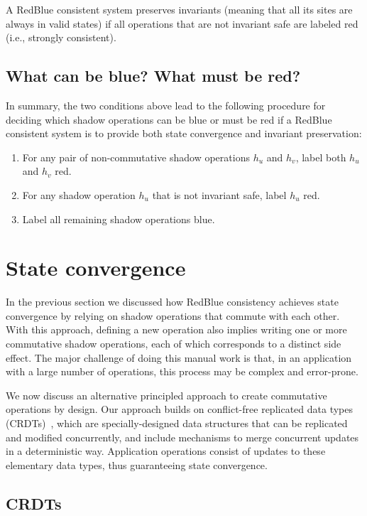\documentclass[11pt]{article}
\begin{document}
\begin{theorem}
A RedBlue consistent system preserves invariants (meaning that all its sites are always in valid states) if all operations that are not invariant safe are labeled red (i.e., strongly consistent).
\end{theorem}
\fi

\subsection{What can be blue?  What must be red?}
\label{ch:redblue:sect:labelmethod}
In summary, the two conditions above lead to the following procedure for deciding
which shadow operations can be
blue or must be red if a RedBlue consistent system is to provide both
state convergence and invariant preservation:
\begin{enumerate}
\item For any pair of non-commutative shadow operations $h_u$ and $h_v$, label both $h_u$ and $h_v$ red.
\item For any shadow operation $h_u$ that is not invariant safe,
label $h_u$ red.
\item Label all remaining shadow operations blue.
\end{enumerate}

\section{State convergence}
\label{sec:crdt}
In the previous section we discussed how RedBlue consistency achieves state convergence by
relying on shadow operations that commute with each other.
With this approach, defining a new operation also implies
writing one or more commutative shadow operations, each of which corresponds to a distinct side effect.
The major challenge of doing this manual work
is that, in an application with a large number of operations, this process may be
complex and error-prone.

We now discuss an alternative principled approach to create commutative operations by design.
Our approach builds on conflict-free replicated data types (CRDTs)~\cite{crdts}, which are
specially-designed data structures that can be replicated and modified concurrently,
and include mechanisms to merge concurrent updates in a deterministic way.
Application operations consist of updates to these elementary data types, thus
guaranteeing state convergence.

\subsection{CRDTs}
\end{document}
